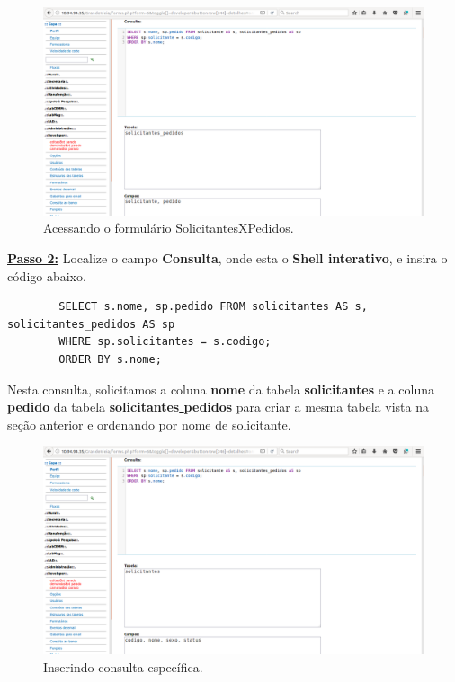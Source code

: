 \documentclass[9pt]{report}
\begin{document}
{      \begin{figure}[H]
        \includegraphics[width=\textwidth]{2_Formularios/5_Consulta_especifica/52.png}
        \caption{Acessando o formulário SolicitantesXPedidos.}
        \label{fig:editorformSP}
      \end{figure}

      \underline{\textbf{Passo 2:}} Localize o campo
      \textbf{Consulta}, onde esta o \textbf{Shell interativo}, e
      insira o código abaixo.

      \begin{lstlisting}        
        SELECT s.nome, sp.pedido FROM solicitantes AS s, solicitantes_pedidos AS sp
        WHERE sp.solicitantes = s.codigo;
        ORDER BY s.nome;  
      \end{lstlisting}

      Nesta consulta, solicitamos a coluna \textbf{nome} da tabela
      \textbf{solicitantes} e a coluna \textbf{pedido} da tabela
      \textbf{solicitantes\underline{ }pedidos} para criar a mesma
      tabela vista na seção anterior e ordenando por nome de
      solicitante.

      \begin{figure}[H]
        \includegraphics[width=\textwidth]{2_Formularios/5_Consulta_especifica/53.png}
        \caption{Inserindo consulta específica.}
        \label{fig:consultaesp}
      \end{figure}

}
\end{document}

